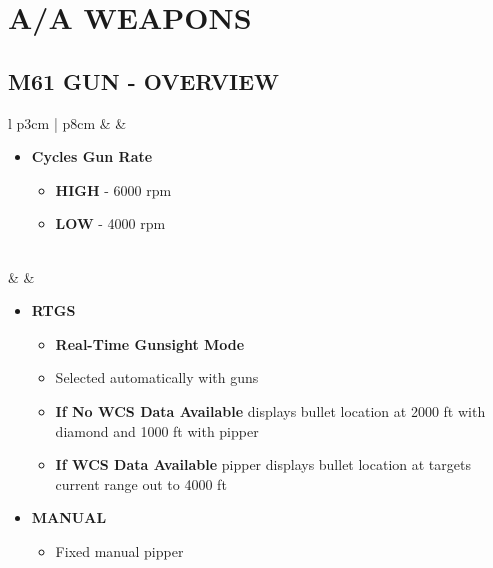 \documentclass[8pt,usenames,dvipsnames,twoside]{article}
\begin{document}
		
	
		\cleardoublepage
		
		\section{A/A WEAPONS}
		
		\subsection{M61 GUN - OVERVIEW}
		\begin{center}
			\begin{longtable}{l p{3cm} | p{8cm}}
				\toprule
				\textbullet &  \hfill\null {} & 
				\begin{minipage}[t]{\linewidth}
					\vspace{-7pt}
					\begin{itemize}
						\item \textbf{Cycles Gun Rate}
						\begin{itemize}
							\item \textbf{HIGH} - 6000 rpm
							\item \textbf{LOW} - 4000 rpm
						\end{itemize} 
					\end{itemize} 
				\end{minipage} \\
				\midrule
				\textbullet &  & 
				\begin{minipage}[t]{\linewidth}
					\vspace{-7pt}
					\begin{itemize}
						\item \textbf{RTGS}
						\begin{itemize}
							\item \textbf{Real-Time Gunsight Mode}
							\item Selected automatically with guns
							\item \textbf{If No WCS Data Available} displays bullet location at 2000 ft with diamond and 1000 ft with pipper
							\item \textbf{If WCS Data Available} pipper displays bullet location at targets current range out to 4000 ft
						\end{itemize}
						\item \textbf{MANUAL} 
						\begin{itemize}
							\item Fixed manual pipper 

\end{itemize}
\end{itemize}
\end{minipage}
\end{longtable}
\end{center}
\end{document}

